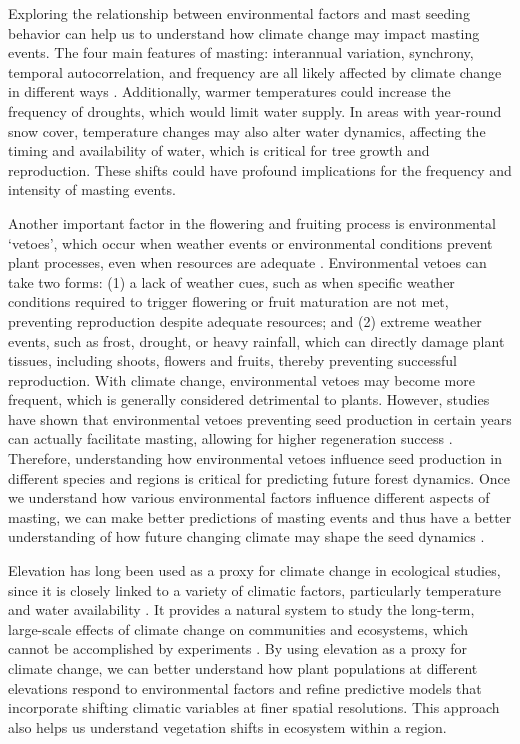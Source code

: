 \documentclass[11pt,letter]{article}
\begin{document}
Exploring the relationship between environmental factors and mast seeding behavior can help us to understand how climate change may impact masting events. The four main features of masting: interannual variation, synchrony, temporal autocorrelation, and frequency are all likely affected by climate change in different ways \citep{hacket2021climate}. Additionally, warmer temperatures could increase the frequency of droughts, which would limit water supply. In areas with year-round snow cover, temperature changes may also alter water dynamics, affecting the timing and availability of water, which is critical for tree growth and reproduction. These shifts could have profound implications for the frequency and intensity of masting events.

Another important factor in the flowering and fruiting process is environmental `vetoes', which occur when weather events or environmental conditions prevent plant processes, even when resources are adequate \citep{bogdziewicz2022will}. Environmental vetoes can take two forms: (1) a lack of weather cues, such as when specific weather conditions required to trigger flowering or fruit maturation are not met, preventing reproduction despite adequate resources; and (2) extreme weather events, such as frost, drought, or heavy rainfall, which can directly damage plant tissues, including shoots, flowers and fruits, thereby preventing successful reproduction. With climate change, environmental vetoes may become more frequent, which is generally considered detrimental to plants. However, studies have shown that environmental vetoes preventing seed production in certain years can actually facilitate masting, allowing for higher regeneration success \citep{bogdziewicz2018correlated, bogdziewicz2019environmental}. Therefore, understanding how environmental vetoes influence seed production in different species and regions is critical for predicting future forest dynamics.  Once we understand how various environmental factors influence different aspects of masting, we can make better predictions of masting events and thus have a better understanding of how future changing climate may shape the seed dynamics \citep{hacket2021climate}.

Elevation has long been used as a proxy for climate change in ecological studies, since it is closely linked to a variety of climatic factors, particularly temperature and water availability \citep{korner2007use}. It provides a natural system to study the long-term, large-scale effects of climate change on communities and ecosystems, which cannot be accomplished by experiments \citep{sundqvist2013community}. By using elevation as a proxy for climate change, we can better understand how plant populations at different elevations respond to environmental factors and refine predictive models that incorporate shifting climatic variables at finer spatial resolutions. This approach also helps us understand vegetation shifts in ecosystem within a region.
\end{document}
